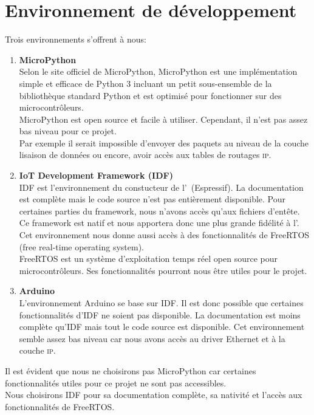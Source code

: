 \section{Environnement de développement}
    Trois environnements s'offrent à nous:
    \begin{enumerate}
        \item \textbf{MicroPython}\\
            Selon le site officiel de MicroPython\cite{micropython_w}, MicroPython
            est une implémentation simple et efficace de Python 3 incluant un
            petit sous-ensemble de la bibliothèque standard Python et est
            optimisé pour fonctionner sur des microcontrôleurs.\\
            MicroPython est open source et facile à utiliser. Cependant,
            il n'est pas assez bas niveau pour ce projet.\\
            Par exemple il serait impossible d'envoyer des paquets au niveau de la
            couche lisaison de données ou encore, avoir accès aux tables de routages \textsc{ip}.\\
        
        \item \textbf{IoT Development Framework (IDF)}\\
            IDF est l'environnement du constucteur de l'\esp\ (Espressif).
            La documentation est complète mais le code source n'est pas entièrement
            disponible. Pour certaines parties du framework, nous n'avons accès qu'aux
            fichiers d'entête.\\
            Ce framework est natif et nous apportera donc une plus grande fidélité à l'\esp. \\
            Cet environnement nous donne aussi accès à des fonctionnalités de FreeRTOS
            (free real-time operating system).\\
            FreeRTOS est un système d'exploitation temps réel open source pour microcontrôleurs.
            Ses fonctionnalités pourront nous être utiles pour le projet.\\

        \item \textbf{Arduino}\\
            L'environnement Arduino se base sur IDF. Il est donc possible que certaines
            fonctionnalités d'IDF ne soient pas disponible. 
            La documentation est moins complète qu'IDF mais tout le code source est disponible.
            Cet environnement semble assez bas niveau car nous avons accès au driver Ethernet
            et à la couche \textsc{ip}.
    \end{enumerate}
    \vspace{1cm}
    Il est évident que nous ne choisirons pas MicroPython car certaines fonctionnalités utiles
    pour ce projet ne sont pas accessibles.\\
    Nous choisirons IDF pour sa documentation complète, sa nativité et l'accès aux
    fonctionnalités de FreeRTOS.

